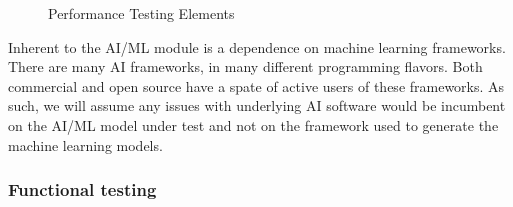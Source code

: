 \begin{figure}[!h]
\centering
{}
\caption{Performance Testing Elements}
\label{fg:testing_arch} 
\end{figure}

Inherent to the AI/ML module is a dependence on machine learning frameworks. There are many AI frameworks, in many different programming flavors. Both commercial and open source have a spate of active users of these frameworks. As such, we will assume any issues with underlying AI software would be incumbent on the AI/ML model under test and not on the framework used to generate the machine learning models.  

\subsubsection{Functional testing}

